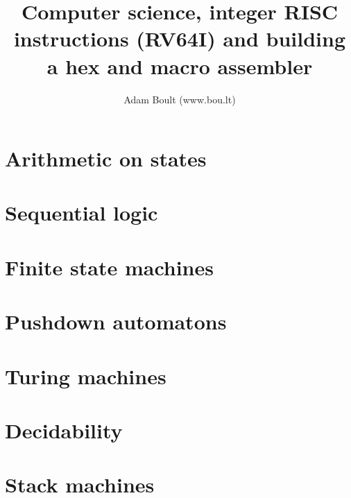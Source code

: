 \documentclass[oneside]{book}
\begin{document}
\author{Adam Boult (www.bou.lt)}
\title{Computer science, integer RISC instructions (RV64I) and building a hex and macro assembler}
\maketitle

\setcounter{tocdepth}{0}
\tableofcontents



\part{Arithmetic on states}






\part{Sequential logic}



\part{Finite state machines}



\part{Pushdown automatons}




\part{Turing machines}





\part{Decidability}











\part{Stack machines}

\end{document}

